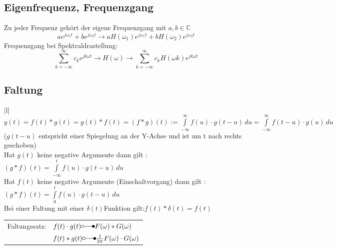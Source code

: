 	\subsection{Eigenfrequenz, Frequenzgang}
	Zu jeder Frequenz gehört der eigene Frequenzgang mit $a, b \in \mathbb{C}$\\
	$$a e^{j\omega_1 t} + b e^{j\omega_2 t} \rightarrow a H(\omega_1) e^{j\omega_1 t} + b H(\omega_2) e^{j\omega_2 t}$$
	Frequenzgang bei Spektraldrastellung: $$\sum_{k=-\infty}^{\infty} c_k e^{jk\omega t} \rightarrow \boxed{H(\omega)}
	\rightarrow \sum_{k=-\infty}^{\infty} c_k H(\omega k) e^{jk\omega t}$$

	
	\subsection{Faltung}
	\begin{tabular}{|l|} \hline
	$y(t) = f(t)\ast g(t) = g(t) \ast f(t) = (f \ast g)(t) :=
	\int\limits_{-\infty}^\infty f(u) \cdot g(t-u)\,du =
	\int\limits_{-\infty}^\infty f(t-u) \cdot g(u)\,du $ \\
	($g(t-u)$ entspricht einer Spiegelung an der Y-Achse und ist um t nach rechts geschoben)\\
	
	Hat $g\left(t\right)$ keine negative Argumente dann gilt :
	$\left(g \ast f \right)\left(t\right)=\int\limits_{-\infty}^t f(u) \cdot
	g(t-u)\,du$\\
	Hat $f\left(t\right)$ keine negative Argumente (Einschaltvorgang) dann gilt :
	$\left(g \ast f \right)\left(t\right)=\int\limits_{0}^t f(u) \cdot
	g(t-u)\,du$\\
	Bei einer Faltung mit einer $\delta\left(t\right)$Funktion
	gilt:$f\left(t\right) \ast \delta\left(t\right) = f\left(t\right)$\\
	
	\begin{tabular}{|l | l |}
		\hline
			Faltungssatz: & $f(t)\cdot g(t) \laplace F(\omega) \ast G(\omega)$ \\
			& $f(t) \ast g(t) \laplace \frac{1}{2\pi}F(\omega) \cdot G(\omega)$ \\
		\hline
	\end{tabular}
	

\end{tabular}
